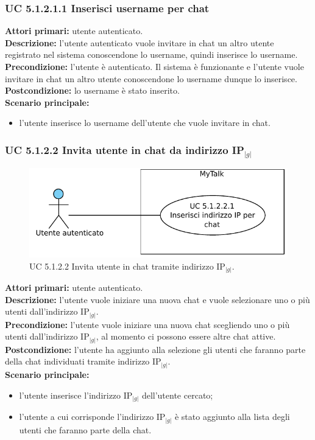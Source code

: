 \subsubsection{UC 5.1.2.1.1 Inserisci username per chat}
\noindent
\textbf{Attori primari:} utente autenticato.\\
\textbf{Descrizione:} l'utente autenticato vuole invitare in chat un altro utente registrato nel sistema conoscendone lo username, quindi inserisce lo username.\\
\textbf{Precondizione:} l'utente è autenticato. Il sistema è funzionante e l'utente vuole invitare in chat un altro utente conoscendone lo username dunque lo inserisce.\\
\textbf{Postcondizione:} lo username è stato inserito.\\
\textbf{Scenario principale:}
\begin{itemize}
\item l'utente inserisce lo username dell'utente che vuole invitare in chat.
\end{itemize}

\subsubsection{UC 5.1.2.2 Invita utente in chat da indirizzo IP$_{|g|}$}

\begin{figure}[htbp]
\centering
\includegraphics[scale=0.7]{./casi_uso/UC5-1-2-2.pdf}
\caption{UC 5.1.2.2 Invita utente in chat tramite indirizzo IP$_{|g|}$.}
\end{figure}

\noindent
\textbf{Attori primari:} utente autenticato.\\
\textbf{Descrizione:} l'utente vuole iniziare una nuova chat e vuole selezionare uno o più utenti dall'indirizzo IP$_{|g|}$.\\
\textbf{Precondizione:} l'utente vuole iniziare una nuova chat scegliendo uno o più utenti dall'indirizzo IP$_{|g|}$, al momento ci possono essere altre chat attive.\\ 
\textbf{Postcondizione:}  l'utente ha aggiunto alla selezione gli utenti che faranno parte della chat individuati tramite indirizzo IP$_{|g|}$.\\
\textbf{Scenario principale:}
\begin{itemize}
\item l'utente inserisce l'indirizzo IP$_{|g|}$ dell'utente cercato;
\item l'utente a cui corrisponde l'indirizzo IP$_{|g|}$ è stato aggiunto alla lista degli utenti che faranno parte della chat.
\end{itemize}

